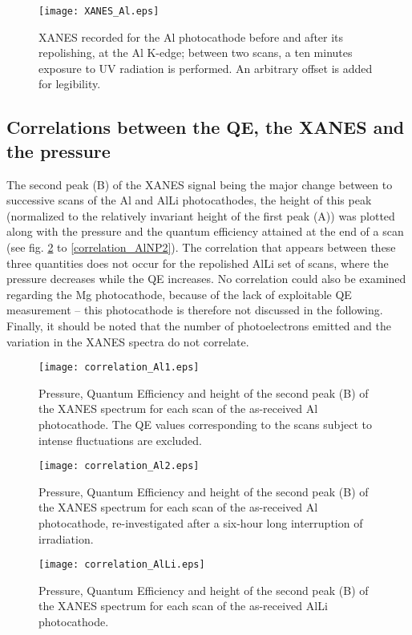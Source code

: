 \documentclass[aip,graphicx]{revtex4-1}
\begin{document}
\begin{figure}
\texttt{[image: XANES\_Al.eps]}%
\caption{XANES recorded for the Al photocathode before and after its repolishing, at the Al K-edge; between two scans, a ten minutes exposure to UV radiation is performed. An arbitrary offset is added for legibility.\label{XANES_Al}}%
\end{figure}

\subsection{Correlations between the QE, the XANES and the pressure}

The second peak (B) of the XANES signal being the major change between to successive scans of the Al and AlLi photocathodes, the height of this peak (normalized to the relatively invariant height of the first peak (A)) was plotted along with the pressure and the quantum efficiency attained at the end of a scan (see fig. \ref{correlation_Al1} to \ref{correlation_AlNP2}). The correlation that appears between these three quantities does not occur for the repolished AlLi set of scans, where the pressure decreases while the QE increases. No correlation could also be examined regarding the Mg photocathode, because of the lack of exploitable QE measurement -- this photocathode is therefore not discussed in the following. Finally, it should be noted that the number of photoelectrons emitted and the variation in the XANES spectra do not correlate.

\begin{figure}
\texttt{[image: correlation\_Al1.eps]}%
\caption{Pressure, Quantum Efficiency and height of the second peak (B) of the XANES spectrum for each scan of the as-received Al photocathode. The QE values corresponding to the scans subject to intense fluctuations are excluded.\label{correlation_Al1}}%
\end{figure}

\begin{figure}
\texttt{[image: correlation\_Al2.eps]}%
\caption{Pressure, Quantum Efficiency and height of the second peak (B) of the XANES spectrum for each scan of the as-received Al photocathode, re-investigated after a six-hour long interruption of irradiation.\label{correlation_Al2}}%
\end{figure}

\begin{figure}
\texttt{[image: correlation\_AlLi.eps]}%
\caption{Pressure, Quantum Efficiency and height of the second peak (B) of the XANES spectrum for each scan of the as-received AlLi photocathode.\label{correlation_AlLi}}%
\end{figure}
\end{document}
